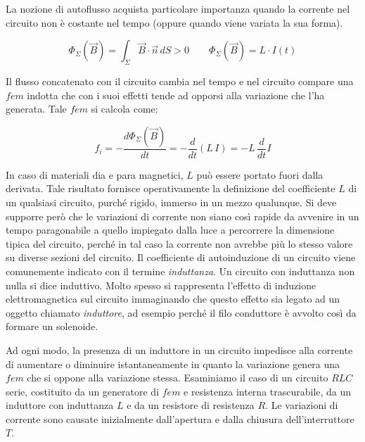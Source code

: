 La nozione di autoflusso acquista particolare importanza quando la corrente nel circuito non è costante nel tempo (oppure quando viene variata la sua forma).

\[
	\Phi_{\Sigma}(\vec{B}) = \int_{\Sigma}\vec{B} \cdot \vec{n} \,dS >0  \qquad \Phi_{\Sigma}(\vec{B}) = L\cdot I(t)
\]

Il flusso concatenato con il circuito cambia nel tempo e nel circuito compare una $fem$ indotta che con i suoi effetti tende ad opporsi alla variazione che l'ha generata. Tale $fem$ si calcola come:

\[
	f_i = - \frac{d\Phi_{\Sigma}(\vec{B} )}{dt} = -\frac{d}{dt}(L\,I) = -L\,\frac{d}{dt}I
\]

In caso di materiali dia e para magnetici, $L$ può essere portato fuori dalla derivata.
Tale risultato fornisce operativamente la definizione del coefficiente $L$ di un qualsiasi circuito, purché rigido, immerso in un mezzo qualunque. Si deve supporre però che le variazioni di corrente non siano così rapide da avvenire in un tempo paragonabile a quello impiegato dalla luce a percorrere la dimensione tipica del circuito, perché in tal caso la corrente non avrebbe più lo stesso valore su diverse sezioni del circuito. Il coefficiente di autoinduzione di un circuito viene comunemente indicato con il termine \emph{induttanza}. Un circuito con induttanza non nulla si dice induttivo.
Molto spesso si rappresenta l'effetto di induzione elettromagnetica sul circuito immaginando che questo effetto sia legato ad un oggetto chiamato \emph{induttore}, ad esempio perché il filo conduttore è avvolto così da formare un solenoide.

Ad ogni modo, la presenza di un induttore in un circuito impedisce alla corrente di aumentare o diminuire istantaneamente in quanto la variazione genera una $fem$ che si oppone alla variazione stessa. Esaminiamo il caso di un circuito $RLC$ serie, costituito da un generatore di $fem$ e resistenza interna trascurabile, da un induttore con induttanza $L$ e da un resistore di resistenza $R$. Le variazioni di corrente sono causate inizialmente dall'apertura e dalla chiusura dell'interruttore $T$.

